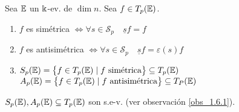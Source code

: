 \begin{defi}
    Sea $\mathbb{E}$ un $\Bbbk$-ev. de $\dim n$. Sea $f \in T_p(\mathbb{E})$.
    \begin{enumerate}
        \item
            $f$ es simétrica $\iff \forall s \in \mathcal{S}_p \quad \underline{s}f = f$

        \item
            $f$ es antisimétrica $\iff \forall s \in \mathcal{S}_p \quad \underline{s}f
            = \varepsilon (s) f$

        \item
            $S_p(\mathbb{E}) = \left\{f \in T_p(\mathbb{E}) \mid f \text{ simétrica}\right\} \subseteq T_p(\mathbb{E})$\\
            $A_p(\mathbb{E}) = \left\{f \in T_p(\mathbb{E}) \mid f \text{ antisimétrica}\right\} \subseteq T_P(\mathbb{E})$

    \end{enumerate}
\end{defi}
\begin{obs}
    $S_p(\mathbb{E}), A_p(\mathbb{E}) \subseteq T_p(\mathbb{E})$ son s.e-v. (ver observación \ref{obs_1.6.1}).
\end{obs}
